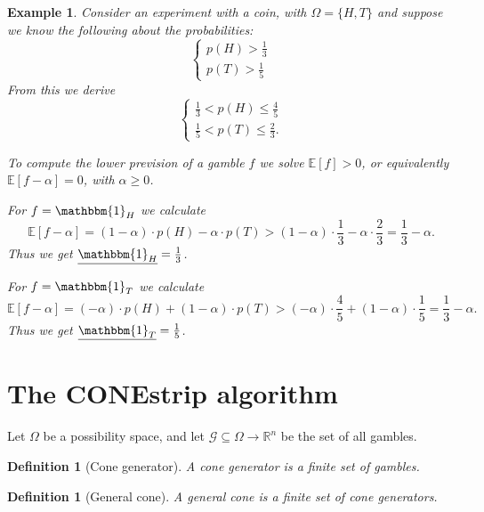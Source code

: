\documentclass{article}
\theoremstyle{mytheorem}
\newtheorem{definition}[theorem]{Definition}
\newtheorem{example}[theorem]{Example}
\newcommand{\set}[1]{\ensuremath{\{ #1 \} }} %
\newcommand{\indicator}[1]{\ensuremath{\mathbbm{1}_{#1}}} %
\newcommand{\expectation}[1]{\ensuremath{\mathbb{E}[{#1}]}} %
\begin{document}
\begin{example}
Consider an experiment with a coin, with $\Omega = \set{H, T}$ and suppose we know the following about the probabilities:
\begin{equation*}
    \begin{cases*}
        p(H) > \frac{1}{3} \\
        p(T) > \frac{1}{5}
    \end{cases*}
\end{equation*}
From this we derive
\begin{equation*}
    \begin{cases*}
        \frac{1}{3} < p(H) \leq \frac{4}{5} \\
        \frac{1}{5} < p(T) \leq \frac{2}{3}.
    \end{cases*}
\end{equation*}

\vspace{0.5cm}
\noindent
To compute the lower prevision of a gamble $f$ we solve $\expectation{f} > 0$, or
equivalently $\expectation{f - \alpha} = 0$, with $\alpha \geq 0$.

\vspace{0.5cm}
\noindent
For $f = \indicator{H}$ we calculate
\[
\expectation{f - \alpha} = 
  (1 - \alpha) \cdot p(H) - \alpha \cdot p(T) > 
  (1 - \alpha) \cdot \frac{1}{3} - \alpha \cdot \frac{2}{3} = 
  \frac{1}{3} - \alpha.
\]
Thus we get $\underline{\indicator{H}} = \frac{1}{3}$.

\vspace{0.5cm}
\noindent
For $f = \indicator{T}$ we calculate
\[
\expectation{f - \alpha} = 
  (- \alpha) \cdot p(H) + (1 - \alpha) \cdot p(T) > 
  (- \alpha) \cdot \frac{4}{5} + (1 - \alpha) \cdot \frac{1}{5} = 
  \frac{1}{3} - \alpha.
\]
Thus we get $\underline{\indicator{T}} = \frac{1}{5}$.
\end{example}

\clearpage
\section{The CONEstrip algorithm}
Let $\Omega$ be a possibility space, and let $\mathcal{G} \subseteq \Omega \rightarrow \mathbb{R}^n$ be the set of all gambles.

\begin{definition}[Cone generator]
A \emph{cone generator} is a finite set of gambles.
\end{definition}

\begin{definition}[General cone]
A \emph{general cone} is a finite set of cone generators.
\end{definition}
\end{document}

